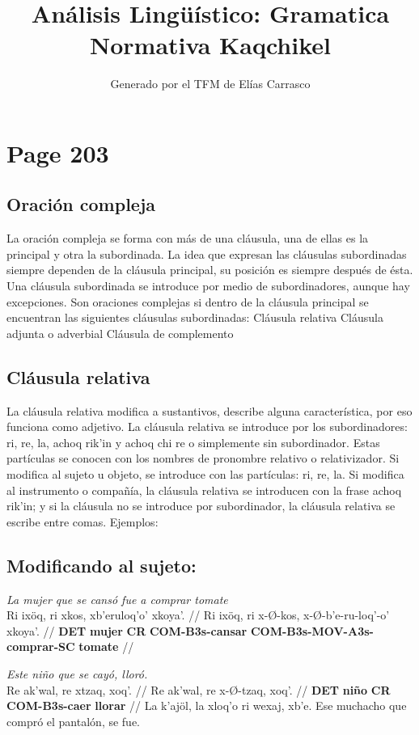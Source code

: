 \documentclass{article}%
\title{Análisis Lingüístico: Gramatica Normativa Kaqchikel}%
\author{Generado por el TFM de Elías Carrasco}%
\begin{document}
%
\normalsize%
\maketitle%
\section{Page 203}%
\label{sec:Page203}%
\subsection{Oración compleja}%
\label{subsec:Oracincompleja}%

%
La oración compleja se forma con más de una cláusula, una de ellas es la principal y %
otra la subordinada. La idea que expresan las cláusulas subordinadas siempre dependen %
de la cláusula principal, su posición es siempre después de ésta. Una cláusula subordinada %
se introduce por medio de subordinadores, aunque hay excepciones. Son oraciones %
complejas si dentro de la cláusula principal se encuentran las siguientes cláusulas %
subordinadas: %
Cláusula relativa %
Cláusula adjunta o adverbial %
Cláusula de complemento %
\subsection{Cláusula relativa}%
\label{subsec:Clusularelativa}%

%
La cláusula relativa modifica a sustantivos, describe alguna característica, por eso %
funciona como adjetivo. La cláusula relativa se introduce por los subordinadores: ri, %
re, la, achoq rik'in y achoq chi re o simplemente sin subordinador. Estas partículas se %
conocen con los nombres de pronombre relativo o relativizador. Si modifica al sujeto u %
objeto, se introduce con las partículas: ri, re, la. Si modifica al instrumento o compañía, %
la cláusula relativa se introducen con la frase achoq rik'in; y si la cláusula no se %
introduce por subordinador, la cláusula relativa se escribe entre comas. Ejemplos: %
\subsection{Modificando al sujeto:}%
\label{subsec:Modificandoalsujeto}%

%
\par\medskip%
\ex
\textit{La mujer que se cansó fue a comprar tomate} \\
\begingl
\gla Ri ixöq, ri xkos, xb'eruloq'o' xkoya'. //
\glb Ri ixöq, ri x-Ø-kos, x-Ø-b'e-ru-loq'-o' xkoya'. //
\glc \textbf{DET} \textbf{mujer} \textbf{CR} \textbf{COM-}\textbf{B3s-}\textbf{cansar} \textbf{COM-}\textbf{B3s-}\textbf{MOV-}\textbf{A3s-}\textbf{comprar-}\textbf{SC} \textbf{tomate} //
\endgl
\xe
%
\medskip%
\par\medskip%
\ex
\textit{Este niño que se cayó, lloró.} \\
\begingl
\gla Re ak'wal, re xtzaq, xoq'. //
\glb Re ak'wal, re x-Ø-tzaq, xoq'. //
\glc \textbf{DET} \textbf{niño} \textbf{CR} \textbf{COM-}\textbf{B3s-}\textbf{caer} \textbf{llorar} //
\endgl
\xe
%
\medskip%
La k'ajöl, la xloq'o ri wexaj, xb'e. %
Ese muchacho que compró el pantalón, se fue. 

%
\end{document}
